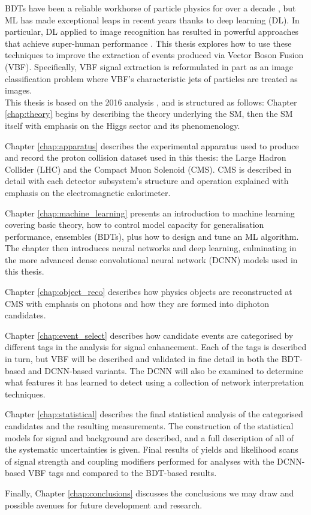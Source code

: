 BDTs have been a reliable workhorse of particle physics for over a decade \cite{MiniBooneBDT}, but ML has made exceptional leaps in recent years thanks to deep learning (DL).
In particular, DL applied to image recognition has resulted in powerful approaches that achieve super-human performance \cite{ResNet}. 
This thesis explores how to use these techniques to improve the extraction of \Hgg events produced via Vector Boson Fusion (VBF). 
Specifically, VBF signal extraction is reformulated in part as an image classification problem where VBF's characteristic jets of particles are treated as images.  
\\

This thesis is based on the 2016 \Hgg analysis \cite{HIG-16-040}, and is structured as follows: Chapter \ref{chap:theory} begins by describing the theory underlying the SM, then the SM itself with emphasis on the Higgs sector and its phenomenology. 

Chapter \ref{chap:apparatus} describes the experimental apparatus used to produce and record the proton collision dataset used in this thesis: the Large Hadron Collider (LHC) and the Compact Muon Solenoid (CMS). CMS is described in detail with each detector subsystem's structure and operation explained with emphasis on the electromagnetic calorimeter.

Chapter \ref{chap:machine_learning} presents an introduction to machine learning covering basic theory, how to control model capacity for generalisation performance, ensembles (BDTs), plus how to design and tune an ML algorithm. The chapter then introduces neural networks and deep learning, culminating in the more advanced dense convolutional neural network (DCNN) models used in this thesis. 

Chapter \ref{chap:object_reco} describes how physics objects are reconstructed at CMS with emphasis on photons and how they are formed into \Hgg diphoton candidates.

Chapter \ref{chap:event_select} describes how candidate \Hgg events are categorised by different tags in the analysis for signal enhancement.  
Each of the tags is described in turn, but VBF will be described and validated in fine detail in both the BDT-based and DCNN-based variants. 
The DCNN will also be examined to determine what features it has learned to detect using a collection of network interpretation techniques.

Chapter \ref{chap:statistical} describes the final statistical analysis of the categorised \Hgg candidates and the resulting measurements.
The construction of the statistical models for signal and background are described, and a full description of all of the systematic uncertainties is given. 
Final results of yields and likelihood scans of signal strength and coupling modifiers performed for analyses with the DCNN-based VBF tags and compared to the BDT-based results. 

Finally, Chapter \ref{chap:conclusions} discusses the conclusions we may draw and possible avenues for future development and research. 




